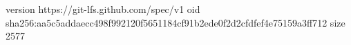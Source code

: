 version https://git-lfs.github.com/spec/v1
oid sha256:aa5c5addaecc498f992120f5651184cf91b2ede0f2d2cfdfef4e75159a3ff712
size 2577
